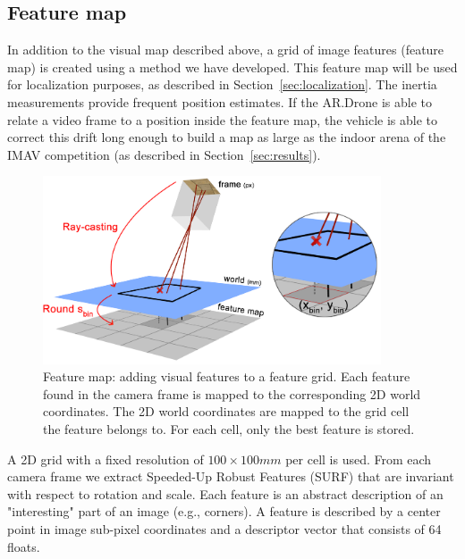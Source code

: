 		\subsection{Feature map}
In addition to the visual map described above, a grid of image features (feature map) is created using a method we have developed.
This feature map will be used for localization purposes, as described in Section~\ref{sec:localization}.
The inertia measurements provide frequent position estimates.
If the AR.Drone is able to relate a video frame to a position inside the feature map, the vehicle is able to correct this drift long enough to build a map 
as large as the indoor arena of the IMAV competition (as described in Section~\ref{sec:results}).

\begin{figure}[htb]
\centering
\includegraphics[width=10cm]{images/mapping3.png}
\caption{Feature map: adding visual features to a feature grid. Each feature found in the camera frame is mapped to the corresponding 2D world coordinates. The 2D world coordinates are mapped to the grid cell the feature belongs to. For each cell, only the best feature is stored.}
\label{fig:mapping3}
\end{figure}

A 2D grid with a fixed resolution of $100 \times 100mm$ per cell is used.
From each camera frame we extract Speeded-Up Robust Features (SURF) \cite{Bay2008cviu} that are invariant with respect to rotation and scale.
Each feature is an abstract description of an "interesting" part of an image (e.g., corners).
A feature is described by a center point in image sub-pixel coordinates and a descriptor vector that consists of 64 floats.

